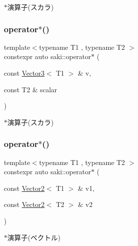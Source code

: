 $\ast$演算子(スカラ) 

\mbox{\label{namespacesaki_a7e8da947afb09174d52b0e4aaa185d71}} 
\subsubsection{\texorpdfstring{operator$\ast$()}{operator*()}\hspace{0.1cm}{\footnotesize\ttfamily [2/4]}}
{\footnotesize\ttfamily template$<$typename T1 , typename T2 $>$ \\
constexpr auto saki\+::operator$\ast$ (\begin{DoxyParamCaption}\item[{const \mbox{\hyperlink{classsaki_1_1_vector3}{Vector3}}$<$ T1 $>$ \&}]{v,  }\item[{const T2 \&}]{scalar }\end{DoxyParamCaption})}



$\ast$演算子(スカラ) 

\mbox{\label{namespacesaki_aa99ace9b4d1710c38d180a75514e748f}} 
\subsubsection{\texorpdfstring{operator$\ast$()}{operator*()}\hspace{0.1cm}{\footnotesize\ttfamily [3/4]}}
{\footnotesize\ttfamily template$<$typename T1 , typename T2 $>$ \\
constexpr auto saki\+::operator$\ast$ (\begin{DoxyParamCaption}\item[{const \mbox{\hyperlink{classsaki_1_1_vector2}{Vector2}}$<$ T1 $>$ \&}]{v1,  }\item[{const \mbox{\hyperlink{classsaki_1_1_vector2}{Vector2}}$<$ T2 $>$ \&}]{v2 }\end{DoxyParamCaption})}



$\ast$演算子(ベクトル) 

\mbox{\label{namespacesaki_a44134827291df1234e04cbd1837a05ac}} 

